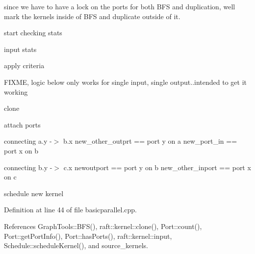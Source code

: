 since we have to have a lock on the ports for both B\+FS and duplication, we\textquotesingle{}ll mark the kernels inside of B\+FS and duplicate outside of it.

start checking stats

input stats

apply criteria

F\+I\+X\+ME, logic below only works for single input, single output..intended to get it working

clone

attach ports

connecting a.\+y -\/$>$ b.\+x new\+\_\+other\+\_\+outprt == port y on a new\+\_\+port\+\_\+in == port x on b

connecting b.\+y -\/$>$ c.\+x newoutport == port y on b new\+\_\+other\+\_\+inport == port x on c

schedule new kernel 

Definition at line 44 of file basicparallel.\+cpp.



References Graph\+Tools\+::\+B\+F\+S(), raft\+::kernel\+::clone(), Port\+::count(), Port\+::get\+Port\+Info(), Port\+::has\+Ports(), raft\+::kernel\+::input, Schedule\+::schedule\+Kernel(), and source\+\_\+kernels.


